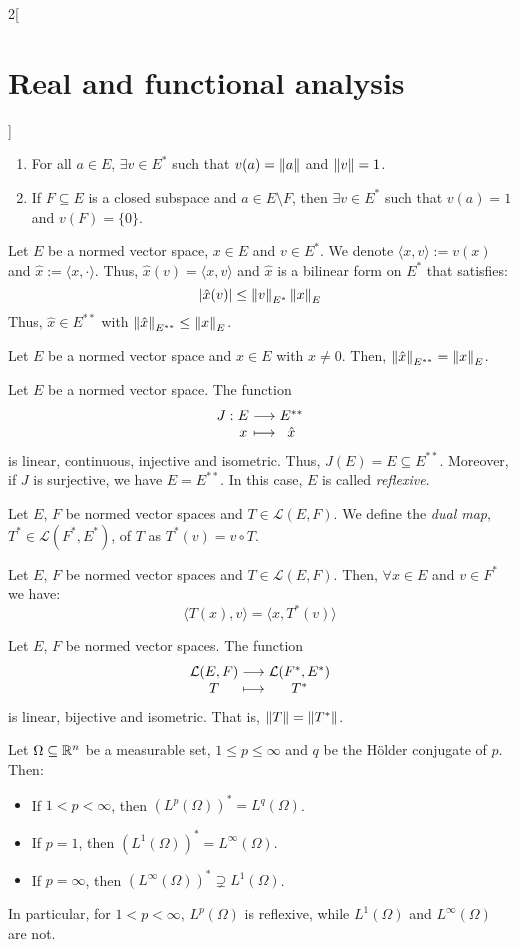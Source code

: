 \documentclass[../../../main_math.tex]{subfiles}
\begin{document}
\begin{multicols}{2}[\section{Real and functional analysis}]
\begin{theorem}
\begin{enumerate}
      \item For all $a\in E$, $\exists v\in E^*$ such that $v(a)=\left\|a\right\|$ and $\left\|v\right\|=1$.
      \item If $F\subseteq E$ is a closed subspace and $a\in E\setminus F$, then $\exists v\in E^*$ such that $v(a)=1$ and $v(F)=\{0\}$.
    \end{enumerate}
  \end{theorem}
  \begin{definition}
    Let $E$ be a normed vector space, $x\in E$ and $v\in E^*$. We denote $\langle x,v\rangle := v(x)$ and $\hat{x}:=\langle x,\cdot\rangle$. Thus, $\hat{x}(v)=\langle x,v\rangle$ and $\hat{x}$ is a bilinear form on $E^*$ that satisfies: $$\abs{\hat{x}(v)}\leq\left\|v\right\|_{E^*}\left\|x\right\|_E$$ Thus, $\hat{x}\in E^{**}$ with $\left\|\hat{x}\right\|_{E^{**}}\leq \left\|x\right\|_E$.
  \end{definition}
  \begin{proposition}
    Let $E$ be a normed vector space and $x\in E$ with $x\ne 0$. Then, $\left\|\hat{x}\right\|_{E^{**}}= \left\|x\right\|_E$.
  \end{proposition}
  \begin{proposition}
    Let $E$ be a normed vector space. The function $$\function{J}{E}{E^{**}}{x}{\hat{x}}$$ is linear, continuous, injective and isometric. Thus, $J(E)=E\subseteq E^{**}$. Moreover, if $J$ is surjective, we have $E=E^{**}$. In this case, $E$ is called \emph{reflexive}.
  \end{proposition}
  \begin{definition}
    Let $E$, $F$ be normed vector spaces and $T\in\mathcal{L}(E,F)$. We define the \emph{dual map}, $T^*\in\mathcal{L}(F^*,E^*)$, of $T$ as $T^*(v)=v\circ T$.
  \end{definition}
  \begin{proposition}
    Let $E$, $F$ be normed vector spaces and $T\in\mathcal{L}(E,F)$. Then, $\forall x\in E$ and $v\in F^*$ we have: $$\langle T(x),v\rangle=\langle x,T^*(v)\rangle$$
  \end{proposition}
  \begin{proposition}
    Let $E$, $F$ be normed vector spaces. The function $$\function{}{\mathcal{L}(E,F)}{\mathcal{L}(F^*,E^*)}{T}{T^*}$$ is linear, bijective and isometric. That is, $\left\|T\right\|=\left\|T^*\right\|$.
  \end{proposition}
  \begin{theorem}
    Let $\Omega\subseteq \mathbb{R}^n$ be a measurable set, $1\leq p\leq \infty$ and $q$ be the Hölder conjugate of $p$. Then:
    \begin{itemize}
      \item If $1<p<\infty$, then ${(L^p(\Omega))}^*=L^q(\Omega)$.
      \item If $p=1$, then ${(L^1(\Omega))}^*=L^\infty(\Omega)$.
      \item If $p=\infty$, then ${(L^\infty(\Omega))}^*\supsetneq L^1(\Omega)$.
    \end{itemize}
    In particular, for $1<p<\infty$, $L^p(\Omega)$ is reflexive, while $L^1(\Omega)$ and $L^\infty(\Omega)$ are not.
  \end{theorem}

\end{multicols}
\end{document}
